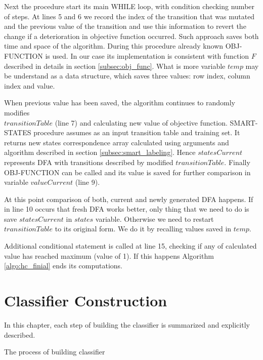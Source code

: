 \documentclass{mini}
\begin{document}
Next the procedure start its main \textsc{WHILE} loop, with condition checking number of steps. At lines 5 and 6 we record the index of the transition that was mutated and the previous value of the transition and use this information to revert the change if a deterioration in objective function occurred. Such approach saves both time and space of the algorithm. During this procedure already known \textsc{OBJ-FUNCTION} is used. In our case its implementation is consistent with function $F$ described in details in section \ref{subsec:obj_func}. What is more variable $temp$ may be understand as a data structure, which saves three values: row index, column index and value.

When previous value has been saved, the algorithm continues to randomly modifies \\ $transitionTable$ (line 7) and calculating new value of objective function. \textsc{SMART-STATES} procedure assumes as an input transition table and training set. It returns new states correspondence array calculated using arguments and algorithm described in section \ref{subsec:smart_labeling}. Hence $statesCurrent$ represents DFA with transitions described by modified $transitionTable$. Finally \textsc{OBJ-FUNCTION} can be called and its value is saved for further comparison in variable $valueCurrent$ (line 9).

At this point comparison of both, current and newly generated DFA happens. If in line 10 occurs that fresh DFA works better, only thing that we need to do is save $statesCurrent$ in $states$ variable. Otherwise we need to restart $transitionTable$ to its original form. We do it by recalling values saved in $temp$.

Additional conditional statement is called at line 15, checking if any of calculated value has reached maximum (value of 1). If this happens Algorithm \ref{algo:hc_finial} ends its computations.

\chapter{Classifier Construction}\label{chap:classifier}

In this chapter, each step of building the classifier is summarized and explicitly described.

The process of building classifier 

\end{document}
